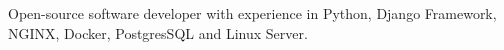 \documentclass[9pt, green]{./template/developercv} %
\begin{document}
\hfill %

\vspace{8pt}

\vspace{2.1mm}
{\small 
\hspace{10pt} Open-source software developer with experience in Python, Django Framework, NGINX, Docker, PostgresSQL and Linux Server. \\
}

\end{document}
